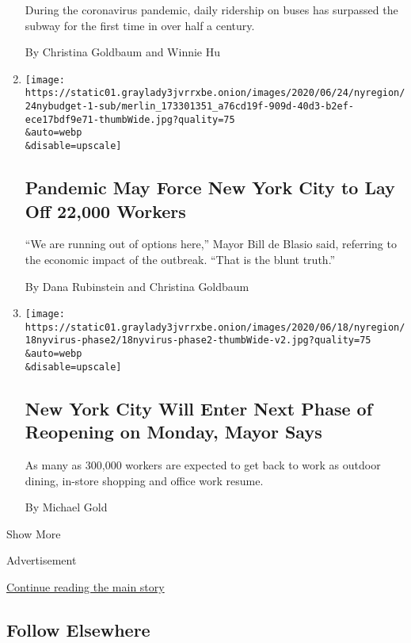 \begin{enumerate}
  During the coronavirus pandemic, daily ridership on buses has
  surpassed the subway for the first time in over half a century.

  By Christina Goldbaum and Winnie Hu
\item
  \href{/2020/06/24/nyregion/budget-layoffs-nyc-mta-coronavirus.html}{}

  \texttt{[image: https://static01.graylady3jvrrxbe.onion/images/2020/06/24/nyregion/24nybudget-1-sub/merlin\_173301351\_a76cd19f-909d-40d3-b2ef-ece17bdf9e71-thumbWide.jpg?quality=75\\\&auto=webp\\\&disable=upscale]}

  \hypertarget{pandemic-may-force-new-york-city-to-lay-off-22000-workers}{%
  \subsection{Pandemic May Force New York City to Lay Off 22,000
  Workers}\label{pandemic-may-force-new-york-city-to-lay-off-22000-workers}}

  ``We are running out of options here,'' Mayor Bill de Blasio said,
  referring to the economic impact of the outbreak. ``That is the blunt
  truth.''

  By Dana Rubinstein and Christina Goldbaum
\item
  \href{/2020/06/18/nyregion/phase-2-reopening-nyc.html}{}

  \texttt{[image: https://static01.graylady3jvrrxbe.onion/images/2020/06/18/nyregion/18nyvirus-phase2/18nyvirus-phase2-thumbWide-v2.jpg?quality=75\\\&auto=webp\\\&disable=upscale]}

  \hypertarget{new-york-city-will-enter-next-phase-of-reopening-on-monday-mayor-says}{%
  \subsection{New York City Will Enter Next Phase of Reopening on
  Monday, Mayor
  Says}\label{new-york-city-will-enter-next-phase-of-reopening-on-monday-mayor-says}}

  As many as 300,000 workers are expected to get back to work as outdoor
  dining, in-store shopping and office work resume.

  By Michael Gold
\end{enumerate}

Show More

Advertisement

\protect\hyperlink{after-mid2}{Continue reading the main story}

\hypertarget{follow-elsewhere}{%
\subsection{Follow Elsewhere}\label{follow-elsewhere}}

